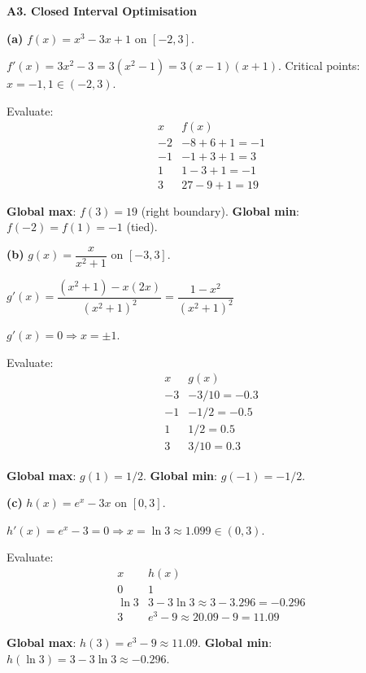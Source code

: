 \documentclass[12pt, a4paper]{article}
\theoremstyle{definition}
\begin{document}
\begin{solbox}
\textbf{A3. Closed Interval Optimisation}

\textbf{(a)} $f(x)=x^3-3x+1$ on $[-2,3]$.

$f'(x)=3x^2-3=3(x^2-1)=3(x-1)(x+1)$. Critical points: $x=-1,1\in(-2,3)$.

Evaluate:
\[
\begin{array}{c|c}
  x & f(x) \\\hline
  -2 & -8+6+1=-1 \\
  -1 & -1+3+1=3 \\
  1  & 1-3+1=-1 \\
  3  & 27-9+1=19
\end{array}
\]

\textbf{Global max}: $f(3)=19$ (right boundary). \quad
\textbf{Global min}: $f(-2)=f(1)=-1$ (tied).

\medskip
\textbf{(b)} $g(x)=\dfrac{x}{x^2+1}$ on $[-3,3]$.

$g'(x)=\dfrac{(x^2+1)-x(2x)}{(x^2+1)^2}=\dfrac{1-x^2}{(x^2+1)^2}$

$g'(x)=0\Rightarrow x=\pm 1$.

Evaluate:
\[
\begin{array}{c|c}
  x & g(x) \\\hline
  -3 & -3/10=-0.3 \\
  -1 & -1/2=-0.5 \\
  1  & 1/2=0.5 \\
  3  & 3/10=0.3
\end{array}
\]

\textbf{Global max}: $g(1)=1/2$. \quad
\textbf{Global min}: $g(-1)=-1/2$.

\medskip
\textbf{(c)} $h(x)=e^x-3x$ on $[0,3]$.

$h'(x)=e^x-3=0\Rightarrow x=\ln 3\approx 1.099\in(0,3)$.

Evaluate:
\[
\begin{array}{c|c}
  x & h(x) \\\hline
  0 & 1 \\
  \ln 3 & 3-3\ln 3\approx 3-3.296=-0.296 \\
  3 & e^3-9\approx 20.09-9=11.09
\end{array}
\]

\textbf{Global max}: $h(3)=e^3-9\approx 11.09$. \quad
\textbf{Global min}: $h(\ln 3)=3-3\ln 3\approx-0.296$.
\end{solbox}
\end{document}
